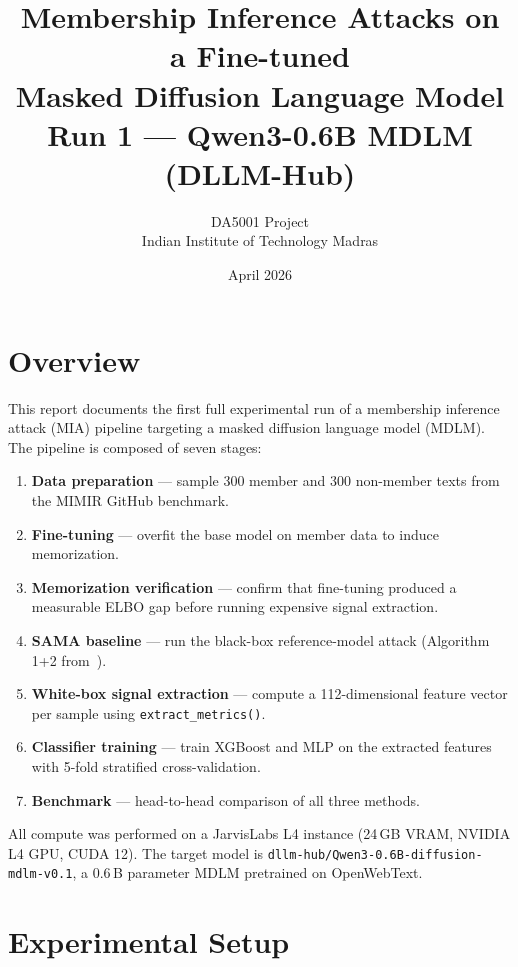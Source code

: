 \documentclass[11pt,a4paper]{article}
\title{\textbf{Membership Inference Attacks on a Fine-tuned\\
Masked Diffusion Language Model}\\[0.5em]
\large Run 1 --- Qwen3-0.6B MDLM (DLLM-Hub)}
\author{DA5001 Project\\
Indian Institute of Technology Madras}
\date{April 2026}
\begin{document}
\maketitle
\tableofcontents
\newpage

\section{Overview}

This report documents the first full experimental run of a membership inference
attack (MIA) pipeline targeting a masked diffusion language model (MDLM).
The pipeline is composed of seven stages:

\begin{enumerate}
  \item \textbf{Data preparation} --- sample 300 member and 300 non-member texts
        from the MIMIR GitHub benchmark.
  \item \textbf{Fine-tuning} --- overfit the base model on member data to induce
        memorization.
  \item \textbf{Memorization verification} --- confirm that fine-tuning produced a
        measurable ELBO gap before running expensive signal extraction.
  \item \textbf{SAMA baseline} --- run the black-box reference-model attack
        (Algorithm 1+2 from~\cite{sama}).
  \item \textbf{White-box signal extraction} --- compute a 112-dimensional feature
        vector per sample using \texttt{extract\_metrics()}.
  \item \textbf{Classifier training} --- train XGBoost and MLP on the extracted
        features with 5-fold stratified cross-validation.
  \item \textbf{Benchmark} --- head-to-head comparison of all three methods.
\end{enumerate}

All compute was performed on a JarvisLabs L4 instance (24\,GB VRAM, NVIDIA L4 GPU,
CUDA 12). The target model is \texttt{dllm-hub/Qwen3-0.6B-diffusion-mdlm-v0.1},
a 0.6\,B parameter MDLM pretrained on OpenWebText.

\section{Experimental Setup}
\end{document}
